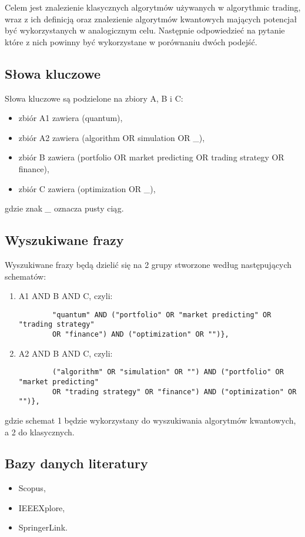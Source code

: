 \documentclass[polish,envcountsect,10pt]{article}
\begin{document}
Celem jest znalezienie klasycznych algorytmów używanych w algorythmic trading, wraz z ich definicją oraz znalezienie algorytmów kwantowych mających potencjał być wykorzystanych w analogicznym celu.
Następnie odpowiedzieć na pytanie które z nich powinny być wykorzystane w porównaniu dwóch podejść.

\subsection{Słowa kluczowe}
Słowa kluczowe są podzielone na zbiory A, B i C:
\begin{itemize}
	\item zbiór A1 zawiera (quantum),
	\item zbiór A2 zawiera (algorithm OR simulation OR \_),
	\item zbiór B zawiera (portfolio OR market predicting OR trading strategy OR finance),
	\item zbiór C zawiera (optimization OR \_),
\end{itemize}
gdzie znak \emph{\_} oznacza pusty ciąg.

\subsection{Wyszukiwane frazy}
Wyszukiwane frazy będą dzielić się na 2 grupy stworzone według następujących schematów:
\begin{enumerate}
	\item A1 AND B AND C, czyli:
	      \begin{verbatim}
		"quantum" AND ("portfolio" OR "market predicting" OR "trading strategy"
		OR "finance") AND ("optimization" OR "")},
	\end{verbatim}
	\item A2 AND B AND C, czyli:
	      \begin{verbatim}
		("algorithm" OR "simulation" OR "") AND ("portfolio" OR "market predicting"
		OR "trading strategy" OR "finance") AND ("optimization" OR "")},
	\end{verbatim}
\end{enumerate}
gdzie schemat 1 będzie wykorzystany do wyszukiwania algorytmów kwantowych, a 2 do klasycznych.

\subsection{Bazy danych literatury}

\begin{itemize}
	\item Scopus,
	\item IEEEXplore,
	\item SpringerLink.
\end{itemize}
\end{document}
